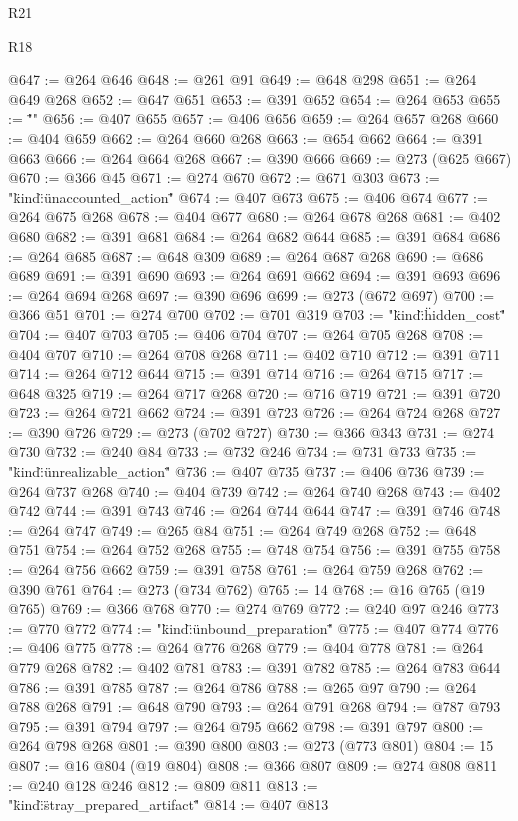 \begin{lexlean}{R21}
\begin{lexlean}{R18}
\begin{coremodule}
{{{{{{{{{{{{{{{{{{{{{{{{{{{{{{{{{{{{{{{{{{{{{{{{{{{{{{{{{{{{{{{{{{{{{{{{{{{{{{{{{{{{{{{{{{{{{{{{{{{{{{{{{{{{{{{{{{{{{{{{{{{{{{{{{{{{{{@647 := @264 @646
@648 := @261 @91
@649 := @648 @298
@651 := @264 @649 @268
@652 := @647 @651
@653 := @391 @652
@654 := @264 @653
@655 := "\"}"
@656 := @407 @655
@657 := @406 @656
@659 := @264 @657 @268
@660 := @404 @659
@662 := @264 @660 @268
@663 := @654 @662
@664 := @391 @663
@666 := @264 @664 @268
@667 := @390 @666
@669 := @273 (@625 @667)
@670 := @366 @45
@671 := @274 @670
@672 := @671 @303
@673 := "{\"kind\":\"unaccounted_action\""
@674 := @407 @673
@675 := @406 @674
@677 := @264 @675 @268
@678 := @404 @677
@680 := @264 @678 @268
@681 := @402 @680
@682 := @391 @681
@684 := @264 @682 @644
@685 := @391 @684
@686 := @264 @685
@687 := @648 @309
@689 := @264 @687 @268
@690 := @686 @689
@691 := @391 @690
@693 := @264 @691 @662
@694 := @391 @693
@696 := @264 @694 @268
@697 := @390 @696
@699 := @273 (@672 @697)
@700 := @366 @51
@701 := @274 @700
@702 := @701 @319
@703 := "{\"kind\":\"hidden_cost\""
@704 := @407 @703
@705 := @406 @704
@707 := @264 @705 @268
@708 := @404 @707
@710 := @264 @708 @268
@711 := @402 @710
@712 := @391 @711
@714 := @264 @712 @644
@715 := @391 @714
@716 := @264 @715
@717 := @648 @325
@719 := @264 @717 @268
@720 := @716 @719
@721 := @391 @720
@723 := @264 @721 @662
@724 := @391 @723
@726 := @264 @724 @268
@727 := @390 @726
@729 := @273 (@702 @727)
@730 := @366 @343
@731 := @274 @730
@732 := @240 @84
@733 := @732 @246
@734 := @731 @733
@735 := "{\"kind\":\"unrealizable_action\""
@736 := @407 @735
@737 := @406 @736
@739 := @264 @737 @268
@740 := @404 @739
@742 := @264 @740 @268
@743 := @402 @742
@744 := @391 @743
@746 := @264 @744 @644
@747 := @391 @746
@748 := @264 @747
@749 := @265 @84
@751 := @264 @749 @268
@752 := @648 @751
@754 := @264 @752 @268
@755 := @748 @754
@756 := @391 @755
@758 := @264 @756 @662
@759 := @391 @758
@761 := @264 @759 @268
@762 := @390 @761
@764 := @273 (@734 @762)
@765 := 14
@768 := @16 @765 (@19 @765)
@769 := @366 @768
@770 := @274 @769
@772 := @240 @97 @246
@773 := @770 @772
@774 := "{\"kind\":\"unbound_preparation\""
@775 := @407 @774
@776 := @406 @775
@778 := @264 @776 @268
@779 := @404 @778
@781 := @264 @779 @268
@782 := @402 @781
@783 := @391 @782
@785 := @264 @783 @644
@786 := @391 @785
@787 := @264 @786
@788 := @265 @97
@790 := @264 @788 @268
@791 := @648 @790
@793 := @264 @791 @268
@794 := @787 @793
@795 := @391 @794
@797 := @264 @795 @662
@798 := @391 @797
@800 := @264 @798 @268
@801 := @390 @800
@803 := @273 (@773 @801)
@804 := 15
@807 := @16 @804 (@19 @804)
@808 := @366 @807
@809 := @274 @808
@811 := @240 @128 @246
@812 := @809 @811
@813 := "{\"kind\":\"stray_prepared_artifact\""
@814 := @407 @813
}}}}}}}}}}}}}}}}}}}}}}}}}}}}}}}}}}}}}}}}}}}}}}}}}}}}}}}}}}}}}}}}}}}}}}}}}}}}}}}}}}}}}}}}}}}}}}}}}}}}}}}}}}}}}}}}}}}}}}}}}}}}}}}}}}}}}}}}}}
\end{coremodule}
\end{lexlean}
\end{lexlean}
